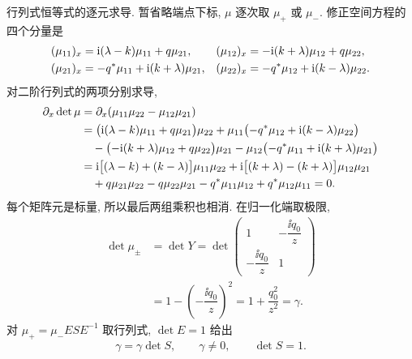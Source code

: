 \par\medskip\noindent 行列式恒等式的逐元求导.\quad
暂省略端点下标, $\mu$ 逐次取 $\mu_+$ 或 $\mu_-$.
修正空间方程的四个分量是
\begin{align*}
(\mu_{11})_x&=\mathrm{i}(\lambda-k)\mu_{11}+q\mu_{21},&
(\mu_{12})_x&=-\mathrm{i}(k+\lambda)\mu_{12}+q\mu_{22},\\
(\mu_{21})_x&=-{q}^{*}\mu_{11}+\mathrm{i}(k+\lambda)\mu_{21},&
(\mu_{22})_x&=-{q}^{*}\mu_{12}+\mathrm{i}(k-\lambda)\mu_{22}.
\end{align*}
对二阶行列式的两项分别求导,
\begin{align*}
\partial_x\det\mu
&=\partial_x(\mu_{11}\mu_{22}-\mu_{12}\mu_{21})\\
&=\bigl(\mathrm{i}(\lambda-k)\mu_{11}+q\mu_{21}\bigr)\mu_{22}
+\mu_{11}\bigl(-{q}^{*}\mu_{12}+\mathrm{i}(k-\lambda)\mu_{22}\bigr)\\
&\quad-\bigl(-\mathrm{i}(k+\lambda)\mu_{12}+q\mu_{22}\bigr)\mu_{21}
-\mu_{12}\bigl(-{q}^{*}\mu_{11}+\mathrm{i}(k+\lambda)\mu_{21}\bigr)\\
&=\mathrm{i}\bigl[(\lambda-k)+(k-\lambda)\bigr]\mu_{11}\mu_{22}
+\mathrm{i}\bigl[(k+\lambda)-(k+\lambda)\bigr]\mu_{12}\mu_{21}\\
&\quad+q\mu_{21}\mu_{22}-q\mu_{22}\mu_{21}
-{q}^{*}\mu_{11}\mu_{12}+{q}^{*}\mu_{12}\mu_{11}=0.
\end{align*}
每个矩阵元是标量, 所以最后两组乘积也相消.
在归一化端取极限,
\begin{align*}
\det\mu_\pm
&=\det Y
=\det\begin{pmatrix}1&-\dfrac{\ii q_0}{z}\\
-\dfrac{\ii q_0}{z}&1\end{pmatrix}\\
&=1-\left(-\dfrac{\ii q_0}{z}\right)^2
=1+\dfrac{q_0^2}{z^2}=\gamma.
\end{align*}
对 $\mu_+=\mu_-ESE^{-1}$ 取行列式, $\det E=1$ 给出
\begin{equation*}
\gamma=\gamma\det S,
\qquad \gamma\ne0,
\qquad \det S=1.
\end{equation*}

